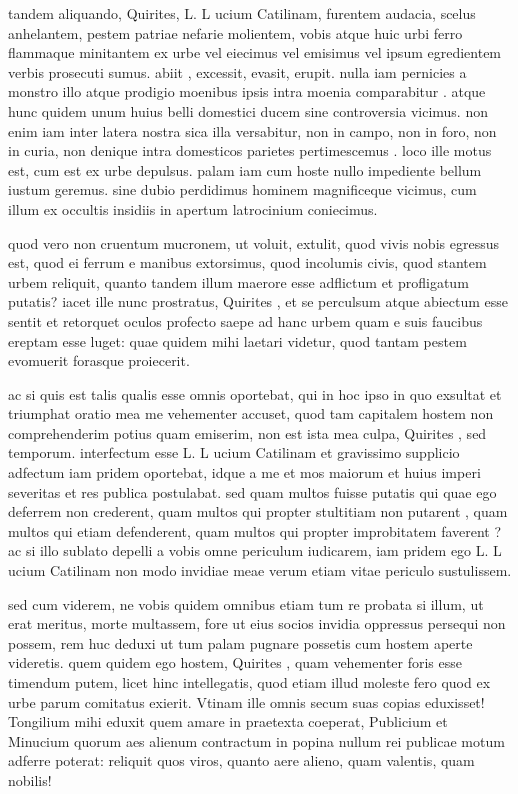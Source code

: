 
 tandem aliquando, Quirites, L. L ucium Catilinam, furentem audacia, scelus anhelantem, pestem patriae nefarie molientem, vobis atque huic urbi ferro flammaque minitantem ex urbe vel eiecimus vel emisimus vel ipsum egredientem verbis prosecuti sumus. abiit , excessit, evasit, erupit. nulla iam pernicies a monstro illo atque prodigio moenibus ipsis intra moenia comparabitur . atque hunc quidem unum huius belli domestici ducem sine controversia vicimus. non enim iam inter latera nostra sica illa versabitur, non in campo, non in foro, non in curia, non denique intra domesticos parietes pertimescemus . loco ille motus est, cum est ex urbe depulsus. palam iam cum hoste nullo impediente bellum iustum geremus. sine dubio perdidimus hominem magnificeque vicimus, cum illum ex occultis insidiis in apertum latrocinium coniecimus.

 quod vero non cruentum mucronem, ut voluit, extulit, quod vivis nobis egressus est, quod ei ferrum e manibus extorsimus, quod incolumis civis, quod stantem urbem reliquit, quanto tandem illum maerore esse adflictum et profligatum putatis? iacet ille nunc prostratus, Quirites , et se perculsum atque abiectum esse sentit et retorquet oculos profecto saepe ad hanc urbem quam e suis faucibus ereptam esse luget: quae quidem mihi laetari videtur, quod tantam pestem evomuerit forasque proiecerit.

 ac si quis est talis qualis esse omnis oportebat, qui in hoc ipso in quo exsultat et triumphat oratio mea me vehementer accuset, quod tam capitalem hostem non comprehenderim potius quam emiserim, non est ista mea culpa, Quirites , sed temporum. interfectum esse L. L ucium Catilinam et gravissimo supplicio adfectum iam pridem oportebat, idque a me et mos maiorum et huius imperi severitas et res publica postulabat. sed quam multos fuisse putatis qui quae ego deferrem non crederent, quam multos qui propter stultitiam non putarent , quam multos qui etiam defenderent, quam multos qui propter improbitatem faverent ? ac si illo sublato depelli a vobis omne periculum iudicarem, iam pridem ego L. L ucium Catilinam non modo invidiae meae verum etiam vitae periculo sustulissem.

 sed cum viderem, ne vobis quidem omnibus etiam tum re probata si illum, ut erat meritus, morte multassem, fore ut eius socios invidia oppressus persequi non possem, rem huc deduxi ut tum palam pugnare possetis cum hostem aperte videretis. quem quidem ego hostem, Quirites , quam vehementer foris esse timendum putem, licet hinc intellegatis, quod etiam illud moleste fero quod ex urbe parum comitatus exierit. Vtinam ille omnis secum suas copias eduxisset! Tongilium mihi eduxit quem amare in praetexta coeperat, Publicium et Minucium quorum aes alienum contractum in popina nullum rei publicae motum adferre poterat: reliquit quos viros, quanto aere alieno, quam valentis, quam nobilis!

